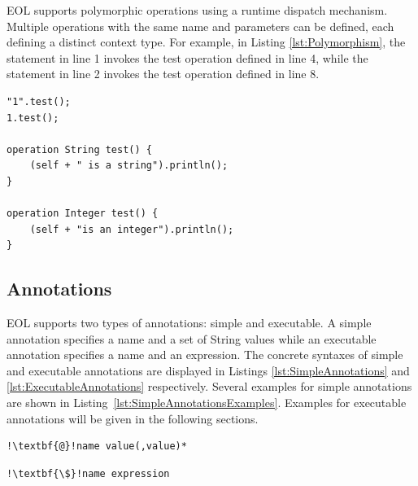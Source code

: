 EOL supports polymorphic operations using a runtime dispatch mechanism. Multiple operations with the same name and parameters can be defined, each defining a distinct context type. For example, in Listing \ref{lst:Polymorphism}, the statement in line 1 invokes the test operation defined in line 4, while the statement in line 2 invokes the test operation defined in line 8.

\begin{lstlisting}[basicstyle=\ttfamily\footnotesize, flexiblecolumns=true, numbers=none, nolol=true, caption=Demonstration of polymorphism in EOL, label=lst:Polymorphism, numbers=left, language=EOL, tabsize=2]
"1".test();
1.test();

operation String test() {
	(self + " is a string").println();
}

operation Integer test() {
	(self + "is an integer").println();
}

\end{lstlisting}

\subsection{Annotations}
\label{sec:Design.EOL.Annotations}
EOL supports two types of annotations: simple and executable. A simple annotation specifies a name and a set of String values while an executable annotation specifies a name and an expression. The concrete syntaxes of simple and executable annotations are displayed in Listings \ref{lst:SimpleAnnotations} and \ref{lst:ExecutableAnnotations} respectively. Several examples for simple annotations are shown in Listing~\ref{lst:SimpleAnnotationsExamples}. Examples for executable annotations will be given in the following sections.

\begin{lstlisting}[basicstyle=\ttfamily\footnotesize, flexiblecolumns=true, numbers=none, nolol=true, caption=Concrete syntax of simple annotations, label=lst:SimpleAnnotations, language=EOL, tabsize=2, escapechar=!]
!\textbf{@}!name value(,value)*
\end{lstlisting}

\begin{lstlisting}[basicstyle=\ttfamily\footnotesize, flexiblecolumns=true, numbers=none, nolol=true, caption=Concrete syntax of executable annotations, label=lst:ExecutableAnnotations, language=EOL, tabsize=2, escapechar=!]
!\textbf{\$}!name expression
\end{lstlisting}

